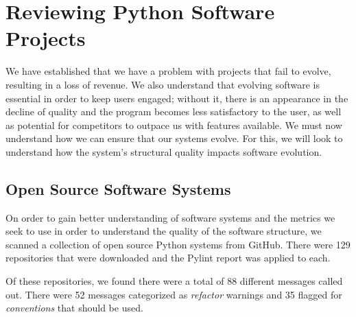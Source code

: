 
\section{Reviewing Python Software Projects}


We have established that we have a problem with projects that fail to evolve, resulting in a loss of revenue. We also understand that evolving software is essential in order to keep users engaged; without it, there is an appearance in the decline of quality and the program becomes less satisfactory to the user, as well as potential for competitors to outpace us with features available. We must now understand how we can ensure that our systems evolve. For this, we will look to understand how the system's structural quality impacts software evolution.

\subsection{Open Source Software Systems} \label{sectionSoftwareData}

On order to gain better understanding of software systems and the metrics we seek to use in order to understand the quality of the software structure, we scanned a collection of open source Python systems from GitHub. There were 129 repositories that were downloaded and the Pylint report was applied to each.

Of these repositories, we found there were a total of 88 different messages called out. There were 52 messages categorized as \emph{refactor} warnings and 35 flagged for \emph{conventions} that should be used.

